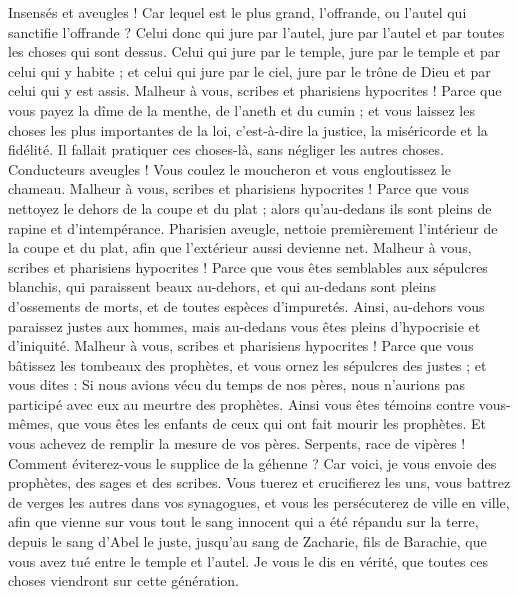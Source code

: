 \begin{multicols}{2}
Insensés et aveugles ! Car lequel est le plus grand, l'offrande, ou l'autel qui sanctifie l'offrande ?
Celui donc qui jure par l'autel, jure par l'autel et par toutes les choses qui sont dessus.
Celui qui jure par le temple, jure par le temple et par celui qui y habite ;
et celui qui jure par le ciel, jure par le trône de Dieu et par celui qui y est assis.
Malheur à vous, scribes et pharisiens hypocrites ! Parce que vous payez la dîme de la menthe, de l'aneth et du cumin ; et vous laissez les choses les plus importantes de la loi, c'est-à-dire la justice, la miséricorde et la fidélité. Il fallait pratiquer ces choses-là, sans négliger les autres choses.
Conducteurs aveugles ! Vous coulez le moucheron et vous engloutissez le chameau.
Malheur à vous, scribes et pharisiens hypocrites ! Parce que vous nettoyez le dehors de la coupe et du plat ; alors qu'au-dedans ils sont pleins de rapine et d'intempérance.
Pharisien aveugle, nettoie premièrement l'intérieur de la coupe et du plat, afin que l'extérieur aussi devienne net.
Malheur à vous, scribes et pharisiens hypocrites ! Parce que vous êtes semblables aux sépulcres blanchis, qui paraissent beaux au-dehors, et qui au-dedans sont pleins d'ossements de morts, et de toutes espèces d'impuretés.
Ainsi, au-dehors vous paraissez justes aux hommes, mais au-dedans vous êtes pleins d'hypocrisie et d'iniquité.
Malheur à vous, scribes et pharisiens hypocrites ! Parce que vous bâtissez les tombeaux des prophètes, et vous ornez les sépulcres des justes ;
et vous dites : Si nous avions vécu du temps de nos pères, nous n'aurions pas participé avec eux au meurtre des prophètes.
Ainsi vous êtes témoins contre vous-mêmes, que vous êtes les enfants de ceux qui ont fait mourir les prophètes.
Et vous achevez de remplir la mesure de vos pères.
Serpents, race de vipères ! Comment éviterez-vous le supplice de la géhenne ?
Car voici, je vous envoie des prophètes, des sages et des scribes. Vous tuerez et crucifierez les uns, vous battrez de verges les autres dans vos synagogues, et vous les persécuterez de ville en ville,
afin que vienne sur vous tout le sang innocent qui a été répandu sur la terre, depuis le sang d'Abel le juste, jusqu'au sang de Zacharie, fils de Barachie, que vous avez tué entre le temple et l'autel.
Je vous le dis en vérité, que toutes ces choses viendront sur cette génération.

\end{multicols}
